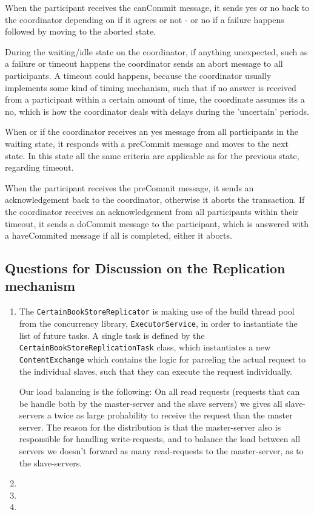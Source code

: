 \documentclass[10pt,a4paper]{article}
\begin{document}
When the participant receives the canCommit message, it sends yes or no back to the coordinator depending on if it agrees or not - or no if a failure happens followed by moving to the aborted state. 
\newline

During the waiting/idle state on the coordinator, if anything unexpected, such as a failure or timeout happens the coordinator sends an abort message to all participants. A timeout could happens, because the coordinator usually implements some kind of timing mechanism, such that if no answer is received from a participant within a certain amount of time, the coordinate assumes its a no, which is how the coordinator deals with delays during the 'uncertain' periods.
\newline

When or if the coordinator receives an yes message from all participants in the waiting state, it responds with a preCommit message and moves to the next state. In this state all the same criteria are applicable as for the previous state, regarding timeout.
\newline

When the participant receives the preCommit message, it sends an acknowledgement back to the coordinator, otherwise it aborts the transaction. If the coordinator receives an acknowledgement from all participants within their timeout, it sends a doCommit message to the participant, which is answered with a haveCommited message if all is completed, either it aborts.

\subsection*{Questions for Discussion on the Replication mechanism}
\begin{enumerate}
	\item The \texttt{CertainBookStoreReplicator} is making use of the build thread pool from the concurrency library, \texttt{ExecutorService}, in order to instantiate the list of future tasks. A single task is defined by the \texttt{CertainBookStore\-ReplicationTask} class, which instantiates a new \texttt{ContentExchange} which contains the logic for parceling the actual request to the individual slaves, such that they can execute the request individually.
	\newline
	
	Our load balancing is the following: On all read requests (requests that can be handle both by the master-server and the slave servers) we gives all slave-servers a twice as large prohability to receive the request than the master server. The reason for the distribution is that the master-server also is responsible for handling write-requests, and to balance the load between all servers we doesn't forward as many read-requests to the master-server, as to the slave-servers.
	\item
	\item
	\item
\end{enumerate}
\end{document}
